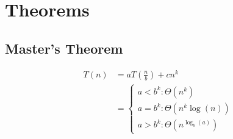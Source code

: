 \appendix

\chapter{Theorems}

  \section{Master's Theorem}

  \begin{align}
    T\left( n \right) &= a T\left( \frac{n}{b} \right) + cn^{k} \\
    &=
    \begin{cases}
      a < b^{k}: \Theta \left( n^{k} \right) \\
      a = b^{k}: \Theta \left( n^{k} \log\left( n \right) \right) \\
      a > b^{k}: \Theta \left( n^{\log_{b}\left( a \right)} \right)
    \end{cases}
  \end{align}
